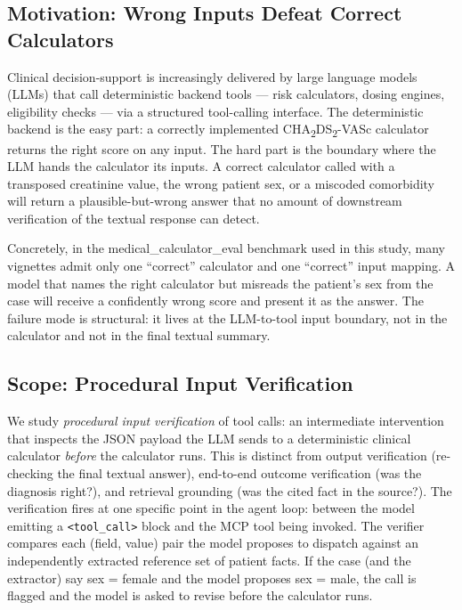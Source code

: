 \subsection{Motivation: Wrong Inputs Defeat Correct Calculators}
\label{sec:intro_motivation}

Clinical decision-support is increasingly delivered by large language
models (LLMs) that call deterministic backend tools --- risk calculators,
dosing engines, eligibility checks --- via a structured tool-calling
interface. The deterministic backend is the easy part: a correctly
implemented CHA\textsubscript{2}DS\textsubscript{2}-VASc calculator
returns the right score on any input. The hard part is the boundary
where the LLM hands the calculator its inputs. A correct calculator
called with a transposed creatinine value, the wrong patient sex, or a
miscoded comorbidity will return a plausible-but-wrong answer that no
amount of downstream verification of the textual response can detect.

Concretely, in the medical\_calculator\_eval benchmark used in this study,
many vignettes admit only one ``correct'' calculator and one ``correct''
input mapping. A model that names the right calculator but misreads
the patient's sex from the case will receive a confidently wrong score
and present it as the answer. The failure mode is structural: it lives
at the LLM-to-tool input boundary, not in the calculator and not in
the final textual summary.

\subsection{Scope: Procedural Input Verification}
\label{sec:intro_scope}

We study \emph{procedural input verification} of tool calls: an
intermediate intervention that inspects the JSON payload the LLM sends
to a deterministic clinical calculator \emph{before} the calculator
runs. This is distinct from output verification (re-checking the final
textual answer), end-to-end outcome verification (was the diagnosis
right?), and retrieval grounding (was the cited fact in the source?).
The verification fires at one specific point in the agent loop: between
the model emitting a \verb|<tool_call>| block and the MCP tool being
invoked. The verifier compares each (field, value) pair the model
proposes to dispatch against an independently extracted reference set
of patient facts. If the case (and the extractor) say sex = female and
the model proposes sex = male, the call is flagged and the model is
asked to revise before the calculator runs.

